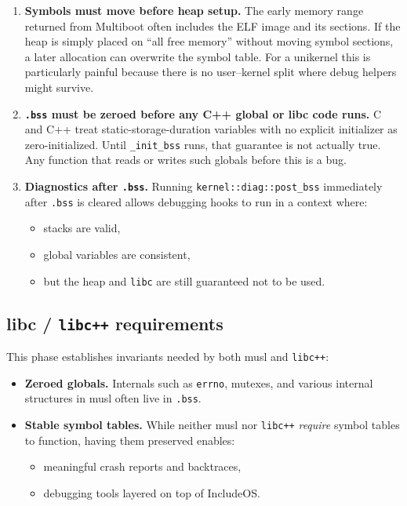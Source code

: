 \documentclass[a4paper,11pt]{article}
\begin{document}
\begin{enumerate}
  \item \textbf{Symbols must move before heap setup.}  
    The early memory range returned from Multiboot often includes the
    ELF image and its sections. If the heap is simply placed on “all
    free memory” without moving symbol sections, a later allocation can
    overwrite the symbol table. For a unikernel this is particularly
    painful because there is no user–kernel split where debug helpers
    might survive.

  \item \textbf{\texttt{.bss} must be zeroed before any C++ global or libc code
    runs.}  
    C and C++ treat static-storage-duration variables with no explicit
    initializer as zero-initialized. Until \texttt{\_init\_bss} runs, that
    guarantee is not actually true. Any function that reads or writes
    such globals before this is a bug.

  \item \textbf{Diagnostics after \texttt{.bss}.}  
    Running \texttt{kernel::diag::post\_bss} immediately after \texttt{.bss}
    is cleared allows debugging hooks to run in a context where:
    \begin{itemize}
      \item stacks are valid,
      \item global variables are consistent,
      \item but the heap and \texttt{libc} are still guaranteed not to be
            used.
    \end{itemize}
\end{enumerate}

\subsection{libc / \texorpdfstring{\texttt{libc++}}{libc++} requirements}

This phase establishes invariants needed by both musl and \texttt{libc++}:

\begin{itemize}
  \item \textbf{Zeroed globals.}  
    Internals such as \texttt{errno}, mutexes, and various internal
    structures in musl often live in \texttt{.bss}.

  \item \textbf{Stable symbol tables.}  
    While neither musl nor \texttt{libc++} \emph{require} symbol tables
    to function, having them preserved enables:
    \begin{itemize}
      \item meaningful crash reports and backtraces,
      \item debugging tools layered on top of IncludeOS.
    \end{itemize}
\end{itemize}
\end{document}
